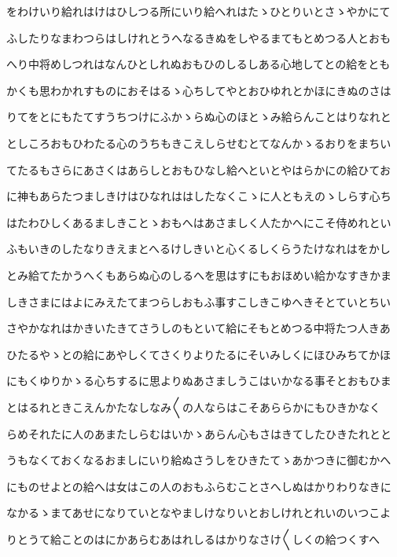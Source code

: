 \documentclass[a4paper,11pt,landscape]{ltjtarticle}
\begin{document}
\par\medskip
をわけいり給れはけはひしつる所にいり給へれはたゝひとりいとさゝやかにて
\par\medskip
ふしたりなまわつらはしけれとうへなるきぬをしやるまてもとめつる人とおも
\par\medskip
へり中将めしつれはなんひとしれぬおもひのしるしある心地してとの給をとも
\par\medskip
かくも思わかれすものにおそはるゝ心ちしてやとおひゆれとかほにきぬのさは
\par\medskip
りてをとにもたてすうちつけにふかゝらぬ心のほとゝみ給らんことはりなれと
\par\medskip
としころおもひわたる心のうちもきこえしらせむとてなんかゝるおりをまちい
\par\medskip
てたるもさらにあさくはあらしとおもひなし給へといとやはらかにの給ひてお
\par\medskip
に神もあらたつましきけはひなれははしたなくこゝに人ともえのゝしらす心ち
\par\medskip
はたわひしくあるましきことゝおもへはあさましく人たかへにこそ侍めれとい
\par\medskip
ふもいきのしたなりきえまとへるけしきいと心くるしくらうたけなれはをかし
\par\medskip
とみ給てたかうへくもあらぬ心のしるへを思はすにもおほめい給かなすきかま
\par\medskip
しきさまにはよにみえたてまつらしおもふ事すこしきこゆへきそとていとちい
\par\medskip
さやかなれはかきいたきてさうしのもといて給にそもとめつる中将たつ人きあ
\par\medskip
ひたるやゝとの給にあやしくてさくりよりたるにそいみしくにほひみちてかほ
\par\medskip
にもくゆりかゝる心ちするに思よりぬあさましうこはいかなる事そとおもひま
\par\medskip
とはるれときこえんかたなしなみ〱の人ならはこそあららかにもひきかなく
\par\medskip
らめそれたに人のあまたしらむはいかゝあらん心もさはきてしたひきたれとと
\par\medskip
うもなくておくなるおましにいり給ぬさうしをひきたてゝあかつきに御むかへ
\par\medskip
にものせよとの給へは女はこの人のおもふらむことさへしぬはかりわりなきに
\par\medskip
なかるゝまてあせになりていとなやましけなりいとおしけれとれいのいつこよ
\par\medskip
りとうて給ことのはにかあらむあはれしるはかりなさけ〱しくの給つくすへ
\end{document}
